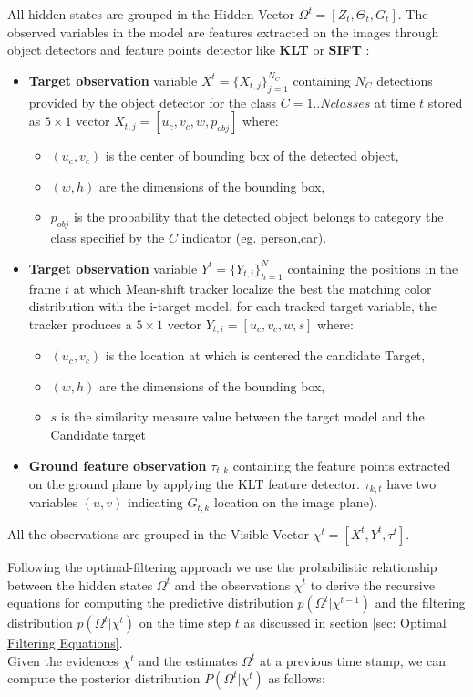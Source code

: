 All hidden states are grouped in the Hidden Vector $\Omega^{t} = [Z_{t}, \Theta_{t}, G_{t}]$.
The observed variables in the model are features extracted on the images through object detectors and feature points detector like \textbf{KLT} or \textbf{SIFT} :
\begin{itemize}
\item \textbf{Target observation} variable $X^t =\{X_{t,j}\}_{j=1}^{N_{C}}$ containing $N_{C}$ detections provided by the object detector for the class $C=1..Nclasses$ at time $t$ stored as $5\times1$ vector $X_{t,j}= [u_c,v_c,w,p_{obj}]$ where:
\begin{itemize}
\item $(u_c,v_c)$ is the center of bounding box of the detected object,
\item $(w, h)$ are the dimensions of the bounding box,
\item $p_{obj}$ is the probability that the detected object belongs to category the class specifief by the $C$ indicator (eg. person,car).
\end{itemize}
\item \textbf{Target observation} variable $Y^t  = \{Y_{t,i} \}_{h=1}^{N}$ containing the positions in the frame $t$ at which Mean-shift tracker localize the best the matching color distribution with the i-target model.
for each tracked target variable, the tracker produces a $5\times1$ vector $Y_{t,i}= [u_c,v_c,w,s]$ where:
\begin{itemize}
\item $(u_c,v_c)$ is the location at which is centered the candidate Target,
\item $(w, h)$ are the dimensions of the bounding box,
\item $s$ is the similarity measure value between the target model and the Candidate target 
\end{itemize}
\item \textbf{Ground feature observation} $\tau_{t,k}$ containing the feature points extracted on the ground plane by applying the KLT feature detector. $\tau_{k,t}$ have two variables $(u,v)$ indicating $G_{t,k}$ location on the image plane). 
\end{itemize}
All the observations are grouped in the Visible Vector $\chi^t = [X^t , Y^t , \tau^{t}]$.

Following the optimal-filtering approach we use the probabilistic relationship between the hidden states $\Omega^{t}$ and the observations $\chi^t$ to derive the recursive equations for computing the predictive distribution $p(\Omega^{t} |\chi^{t-1})$ and the filtering distribution $p(\Omega^{t} |\chi^{t} )$ on the time step $t$ as discussed in section \ref{sec: Optimal Filtering Equations}.\\
Given the evidences $\chi^t$ and the estimates $\Omega^{t}$ at a previous time stamp, we can compute the posterior distribution $P(\Omega^{t} |\chi^t )$ as follows:

